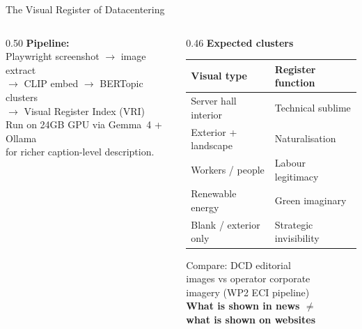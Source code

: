 \documentclass[aspectratio=169,11pt]{beamer}
\newcommand{\iconfull}[2]{\textcolor{#1}{\faIcon{#2}}}
\newcommand{\highlight}[1]{\textcolor{dchighlight}{\textbf{#1}}}
\begin{document}
\begin{frame}[shrink=5]{\iconfull{dcblue}{photo-video}\enspace The Visual Register of Datacentering}
\begin{columns}[T]
\begin{column}{0.50\textwidth}
  \textbf{Pipeline:}\\[0.2em]
  \footnotesize
  Playwright screenshot $\to$ image extract\\
  $\to$ CLIP embed $\to$ BERTopic clusters\\
  $\to$ Visual Register Index (VRI)\\[0.3em]
  Run on 24GB GPU via Gemma~4 + Ollama\\
  for richer caption-level description.
\end{column}
\begin{column}{0.46\textwidth}
  \vspace{0.3em}
  \small\textbf{Expected clusters}\\[0.3em]
  \footnotesize
  \begin{tabular}{@{}ll@{}}
    \toprule
    \textbf{Visual type} & \textbf{Register function} \\
    \midrule
    Server hall interior & Technical sublime \\
    Exterior + landscape & Naturalisation \\
    Workers / people     & Labour legitimacy \\
    Renewable energy     & Green imaginary \\
    Blank / exterior only & Strategic invisibility \\
    \bottomrule
  \end{tabular}
  \vspace{0.4em}
  \footnotesize Compare: DCD editorial\\
  images vs operator corporate\\
  imagery (WP2 ECI pipeline)\\[0.3em]
  \highlight{What is shown in news $\neq$}\\
  \highlight{what is shown on websites}
\end{column}
\end{columns}
\end{frame}
\end{document}
